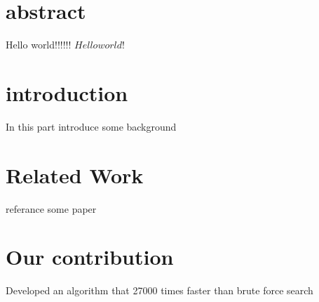 \documentclass[12pt]{article}
\begin{document}
\section{abstract}
Hello world!!!!!!
$Hello world!$ %
\section{introduction}
In this part introduce some background
\section{Related Work}
referance some paper
\section{Our contribution}
Developed an algorithm that 27000 times faster than brute force search
\end{document}

